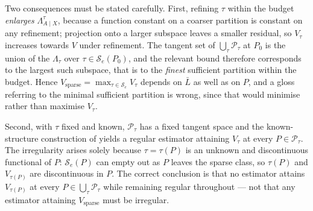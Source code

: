 \documentclass[11pt]{article}
\theoremstyle{plain}
\theoremstyle{definition}
\theoremstyle{remark}
\newcommand{\cS}{\mathcal{S}}
\newcommand{\cP}{\mathcal{P}}
\begin{document}
\noindent Two consequences must be stated carefully. First, refining $\tau$
within the budget \emph{enlarges} $\Lambda^\tau_{A\mid X}$, because a function
constant on a coarser partition is constant on any refinement; projection onto a
larger subspace leaves a smaller residual, so $V_\tau$ increases towards $V$
under refinement. The tangent set of $\bigcup_\tau\cP_\tau$ at $P_0$ is the union
of the $\Lambda_\tau$ over $\tau\in\cS_e(P_0)$, and the relevant bound therefore
corresponds to the largest such subspace, that is to the \emph{finest} sufficient
partition within the budget. Hence
$V_{\mathrm{sparse}}=\max_{\tau\in\cS_e}V_\tau$ depends on $\bar L$ as well as on
$P$, and a gloss referring to the minimal sufficient partition is wrong, since
that would minimise rather than maximise $V_\tau$.

Second, with $\tau$ fixed and known, $\cP_\tau$ has a fixed tangent space and the
known-structure construction of \citet{hahn1998} yields a regular estimator
attaining $V_\tau$ at every $P\in\cP_\tau$. The irregularity arises solely
because $\tau=\tau(P)$ is an unknown and discontinuous functional of $P$:
$\cS_e(P)$ can empty out as $P$ leaves the sparse class, so $\tau(P)$ and
$V_{\tau(P)}$ are discontinuous in $P$. The correct conclusion is that no
estimator attains $V_{\tau(P)}$ at every $P\in\bigcup_\tau\cP_\tau$ while
remaining regular throughout --- not that any estimator attaining
$V_{\mathrm{sparse}}$ must be irregular.
\end{document}

